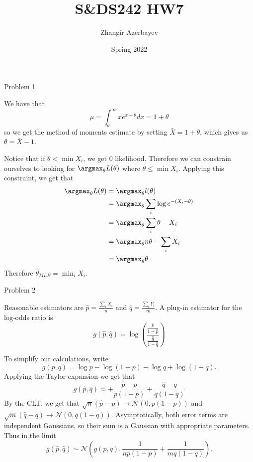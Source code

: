 \documentclass{article}
\title{S\&DS242 HW7}
\author{Zhangir Azerbayev}
\date{Spring 2022}
\begin{document}
\maketitle

\begin{question}{Problem 1}
    \begin{part}
        We have that 
        \[\mu = \int_{\theta}^\infty xe^{x-\theta}dx = 1+\theta\]
        so we get the method of moments estimate by setting $\bar{X}=1+\theta$, which gives us $\theta=\bar{X}-1$. 
    \end{part}
    \begin{part}
        Notice that if $\theta<\min X_i$, we get 0 likelihood. Therefore we can constrain ourselves to looking for $\argmax_\theta L(\theta)$ where $\theta\leq \min X_i$. Applying this constraint, we get that
        \begin{align*}
            \argmax_\theta L(\theta) &=\argmax_\theta l(\theta)\\
                                     &= \argmax_\theta\sum_i \log e^{-(X_i-\theta)}\\
                                     &= \argmax_\theta\sum_i \theta - X_i\\
                                     &= \argmax_\theta n\theta - \sum_i X_i\\
                                     &= \argmax_\theta\theta
        \end{align*}
        Therefore $\hat{\theta}_{MLE} = \min_i X_i$. 
    \end{part}
\end{question}
\begin{question}{Problem 2}
    \begin{part} 
        Reasonable estimators are $\hat{p}=\frac{\sum_iX_i}{n}$ and $\hat{q}=\frac{\sum_iY_i}{m}$. A plug-in estimator for the log-odds ratio is 
        \[g(\hat{p}, \hat{q}) = \log\left(\frac{\frac{\hat{p}}{1-\hat{p}}}{\frac{\hat{q}}{1-\hat{q}}}\right)\]
    \end{part}
    \begin{part}
        To simplify our calculations, write
        \[g(p, q) = \log p -\log(1-p) -\log q + \log (1-q). \]
        Applying the Taylor expansion we get that 
        \[g(\hat{p}, \hat{q}) \approx +\frac{\hat{p}-p}{p(1-p)} + \frac{\hat{q}-q}{q(1-q)}\]
        By the CLT, we get that $\sqrt{n}(\hat{p}-p) \to \mathcal{N}(0, p(1-p))$ and $\sqrt{m}(\hat{q}-q)\to \mathcal{N}(0, q(1-q))$. Asymptotically, both error terms are independent Gaussians, so their sum is a Gaussian with appropriate parameters. Thus in the limit 
        \[g(\hat{p}, \hat{q}) \sim \mathcal{N}\left(g(p, q), \frac{1}{np(1-p)} + \frac{1}{mq(1-q)}\right). \]
    \end{part}
\end{question}
\end{document}
